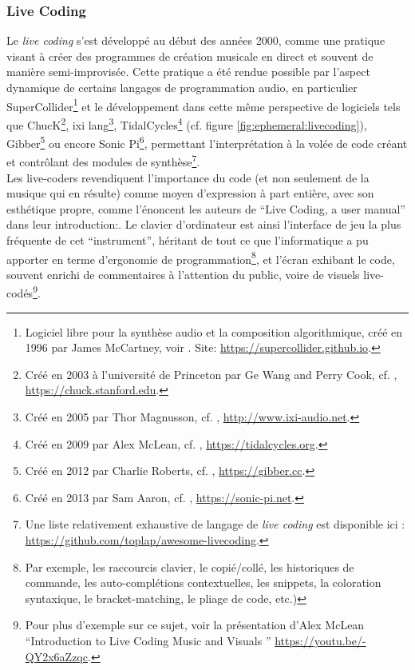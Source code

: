 \subsubsection{Live Coding}

\noindent Le \textit{live coding} s'est développé au début des années 2000, comme une pratique visant à créer des programmes de création musicale en direct et souvent de manière semi-improvisée. Cette pratique a été rendue possible par l'aspect dynamique de certains langages de programmation audio, en particulier SuperCollider\footnote{Logiciel libre pour la synthèse audio et la composition algorithmique, créé en 1996 par James McCartney, voir \cite{mccartney_rethinking_2002}. Site: \url{https://supercollider.github.io}.} et le développement dans cette même perspective de logiciels tels que ChucK\footnote{Créé en 2003 à l'université de Princeton par Ge Wang and Perry Cook, cf. \cite{wang_chuck_2003}, \url{https://chuck.stanford.edu}.}, ixi lang\footnote{Créé en 2005 par Thor Magnusson, cf. \cite{magnusson_ixi_2005}, \url{http://www.ixi-audio.net}.}, TidalCycles\footnote{Créé en 2009 par Alex McLean, cf. \cite{mclean_tidalpattern_2010}, \url{https://tidalcycles.org}.} (cf. figure \ref{fig:ephemeral:livecoding}), Gibber\footnote{Créé en 2012 par Charlie Roberts, cf. \cite{roberts_gibber_2012}, \url{https://gibber.cc}.} ou encore Sonic Pi\footnote{Créé en 2013 par Sam Aaron, cf. \cite{aaron_sonic_2013}, \url{https://sonic-pi.net}.}, permettant l'interprétation à la volée de code créant et contrôlant des modules de synthèse\footnote{Une liste relativement exhaustive de langage de \textit{live coding} est disponible ici : \url{https://github.com/toplap/awesome-livecoding}.}.\\
\indent Les live-coders revendiquent l'importance du code (et non seulement de la musique qui en résulte) comme moyen d'expression à part entière, avec son esthétique propre, comme l'énoncent les auteurs de ``Live Coding, a user manual'' dans leur introduction:. Le clavier d'ordinateur est ainsi l'interface de jeu la plus fréquente de cet ``instrument'', héritant de tout ce que l'informatique a pu apporter en terme d'ergonomie de programmation\footnote{Par exemple, les raccourcis clavier, le copié/collé, les historiques de commande, les auto-complétions contextuelles, les snippets, la coloration syntaxique, le bracket-matching, le pliage de code, etc.)}, et l'écran exhibant le code, souvent enrichi de commentaires à l'attention du public, voire de visuels live-codés\footnote{Pour plus d'exemple sur ce sujet, voir la présentation d'Alex McLean ``Introduction to Live Coding Music and Visuals '' \url{https://youtu.be/-QY2x6aZzqc}.}.\\
